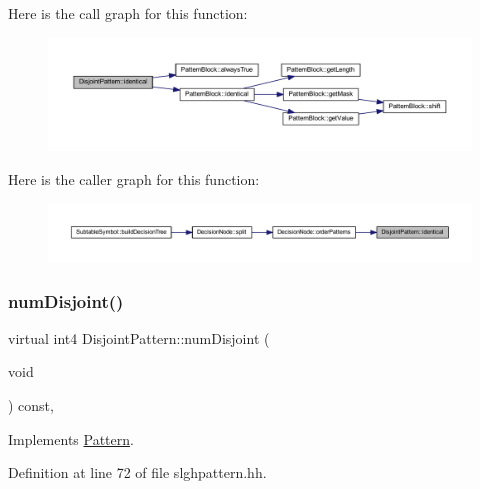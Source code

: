 Here is the call graph for this function\+:
\nopagebreak
\begin{figure}[H]
\begin{center}
\leavevmode
\includegraphics[width=350pt]{class_disjoint_pattern_af075a6468dfdd141511aca9d222af263_cgraph}
\end{center}
\end{figure}
Here is the caller graph for this function\+:
\nopagebreak
\begin{figure}[H]
\begin{center}
\leavevmode
\includegraphics[width=350pt]{class_disjoint_pattern_af075a6468dfdd141511aca9d222af263_icgraph}
\end{center}
\end{figure}
\mbox{\label{class_disjoint_pattern_a33027f50347c5d747a8a473974db466f}} 
\subsubsection{\texorpdfstring{numDisjoint()}{numDisjoint()}}
{\footnotesize\ttfamily virtual int4 Disjoint\+Pattern\+::num\+Disjoint (\begin{DoxyParamCaption}\item[{void}]{ }\end{DoxyParamCaption}) const\hspace{0.3cm}{\ttfamily [inline]}, {\ttfamily [virtual]}}



Implements \mbox{\hyperlink{class_pattern_acc63885639671e7813c6308d3c425ab2}{Pattern}}.



Definition at line 72 of file slghpattern.\+hh.

